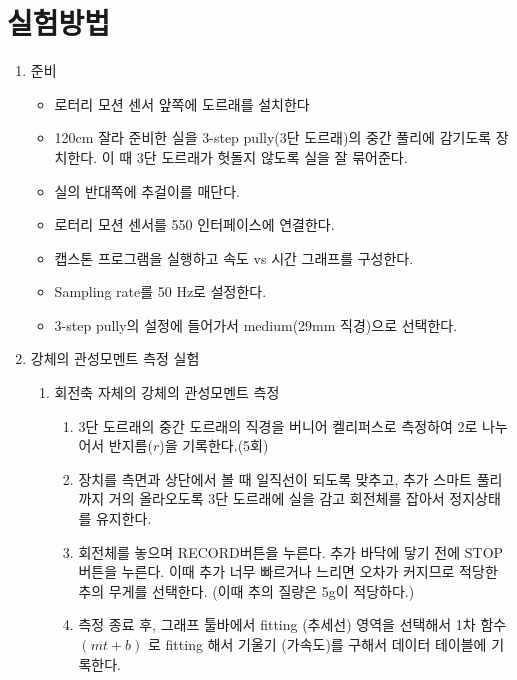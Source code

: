 \documentclass[12pt,a4paper]{article}
\begin{document}
\section{실험방법}
\begin{enumerate}
    \item 준비
        \begin{itemize}
            \item 로터리 모션 센서 앞쪽에 도르래를 설치한다
            \item 120cm 잘라 준비한 실을 3-step pully(3단 도르래)의 중간 풀리에
                감기도록 장치한다. 이 때 3단 도르래가 헛돌지 않도록 실을 잘
                묶어준다.
            \item 실의 반대쪽에 추걸이를 매단다.
            \item 로터리 모션 센서를 550 인터페이스에 연결한다.
            \item 캡스톤 프로그램을 실행하고 속도 vs 시간 그래프를 구성한다.
            \item Sampling rate를 50 Hz로 설정한다.
            \item 3-step pully의 설정에 들어가서 medium(29mm 직경)으로 선택한다.
        \end{itemize}
    \item 강체의 관성모멘트 측정 실험
        \begin{enumerate}
            \item 회전축 자체의 강체의 관성모멘트 측정
                \begin{enumerate}
                    \item 3단 도르래의 중간 도르래의 직경을 버니어 켈리퍼스로
                        측정하여 2로 나누어서 반지름($r$)을 기록한다.(5회)
                    \item 장치를 측면과 상단에서 볼 때 일직선이 되도록 맞추고,
                        추가 스마트 풀리까지 거의 올라오도록 3단 도르래에 실을 감고
                        회전체를 잡아서 정지상태를 유지한다.
                    \item 회전체를 놓으며 RECORD버튼을 누른다. 추가 바닥에 닿기
                        전에 STOP 버튼을 누른다. 이때 추가 너무 빠르거나 느리면
                        오차가 커지므로 적당한 추의 무게를 선택한다.
                        (이때 추의 질량은 5g이 적당하다.)
                    \item 측정 종료 후, 그래프 툴바에서 fitting (추세선) 영역을
                        선택해서 1차 함수 $(mt+b)$ 로 fitting 해서 기울기
                        (가속도)를 구해서 데이터 테이블에 기록한다.

\end{enumerate}
\end{enumerate}
\end{enumerate}
\end{document}
